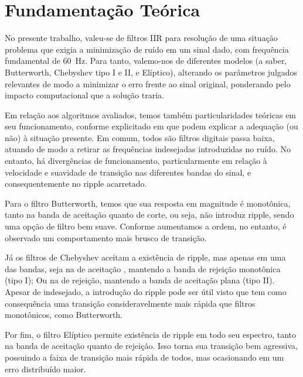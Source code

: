 \section{Fundamentação Teórica}
\label{sec:fund}

No presente trabalho, valeu-se de filtros IIR para resolução de uma situação problema que exigia a minimização de ruído em um sinal dado, com frequência fundamental de \SI{60}{\hertz}. Para tanto, valemo-nos de diferentes modelos (a saber, Butterworth, Chebyshev tipo I e II, e Elíptico), alterando os parâmetros julgados relevantes de modo a minimizar o erro frente ao sinal original, ponderando pelo impacto computacional que a solução traria.

Em relação aos algoritmos avaliados, temos também particularidades teóricas em seu funcionamento, conforme explicitado em \cite{oppenheim2009} que podem explicar a adequação (ou não) à situação presente. Em comum, todos são filtros digitais passa baixa, atuando de modo a retirar as frequências indesejadas introduzidas no ruído. No entanto, há divergências de funcionamento, particularmente em relação à velocidade e suavidade de transição nas diferentes bandas do sinal, e consequentemente no ripple acarretado.

Para o filtro Butterworth, temos que sua resposta em magnitude é monotônica, tanto na banda de aceitação quanto de corte, ou seja, não introduz ripple, sendo uma opção de filtro bem suave. Conforme aumentamos a ordem, no entanto, é observado um comportamento mais brusco de transição.

Já os filtros de Chebyshev aceitam a existência de ripple, mas apenas em uma das bandas, seja na de aceitação , mantendo a banda de rejeição monotônica (tipo I); Ou na de rejeição, mantendo a banda de aceitação plana (tipo II). Apesar de indesejado, a introdução do ripple pode ser útil visto que tem como consequência uma transição consideravelmente mais rápida que filtros monotônicos, como Butterworth.

Por fim, o filtro Elíptico permite existência de ripple em todo seu espectro, tanto na banda de aceitação quanto de rejeição. Isso torna sua transição bem agressiva, possuindo a faixa de transição mais rápida de todos, mas ocasionando em um erro distribuído maior.


